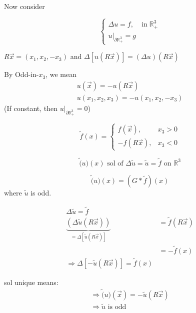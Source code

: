 \documentclass[11pt]{article}
\begin{document}
Now consider 

\begin{equation}
    \begin{cases} 
    \Delta u = f, & \text{in} \;\mathbb{R}_{+}^{3} \\ 
    u|_{\partial \mathbb{R}_{+}^{3}} = g   
    \end{cases}
\end{equation}

$R \vec{x} = (x_1,x_2,-x_3)$ and $\Delta[u(R\vec{x})] = (\Delta u)(R \vec{x})$

By Odd-in-$x_3$, we mean 
\begin{align*}
    u(\vec{x}) = -u(R\vec{x})\\
    u(x_1,x_2,x_3) = -u(x_1,x_2,-x_3)
\end{align*}
(If constant, then $u|_{\partial \mathbb{R}_{+}^{3}} = 0$)

\begin{equation}
    \tilde{f}(x) =
    \begin{cases} 
    f(\vec{x}), & x_3 > 0  \\ 
    -f(R\vec{x}), &    x_3 < 0
    \end{cases}
\end{equation}

\begin{equation}
    \tilde(u)(x) \text{ sol of } \Delta \tilde{u} = \tilde{u} = \tilde{f} \text{ on }\mathbb{R}^{3}
\end{equation}

\begin{equation}
    \tilde(u)(x) = (G * \tilde{f})(x)
\end{equation}
where $\tilde{u}$ is odd.

\begin{align*}
    \Delta \tilde{u} = \tilde{f}\\
    \underbrace{(\Delta \tilde{u}(R\vec{x}))}_{= \Delta[\tilde{u}(R\vec{x})]}  &= \tilde{f}(R\vec{x})\\
    &= - \tilde{f}(x)\\
    \Longrightarrow \Delta[-\tilde{u}(R\vec{x})] = \tilde{f}(x)
\end{align*}

sol unique means:
\begin{align*}
    \Longrightarrow \tilde(u)(\vec{x}) = -\tilde{u}(R\vec{x})\\
    \Longrightarrow \tilde{u} \text{ is odd}
\end{align*}
\end{document}
